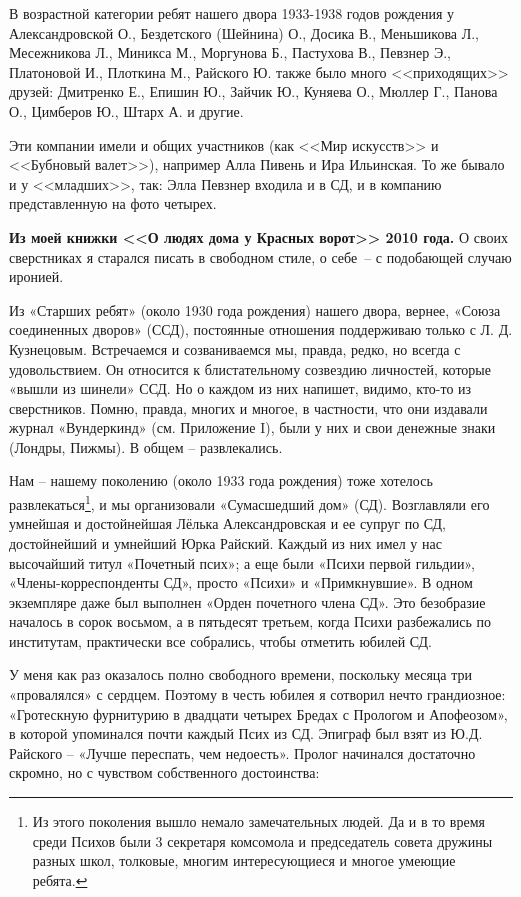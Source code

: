 \restoregeometry

\newpage

В возрастной категории ребят нашего двора 1933-1938 годов рождения у Александровской О., Бездетского (Шейнина) О., Досика В., Меньшикова Л., Месежникова Л., Миникса М., Моргунова Б., Пастухова В., Певзнер Э., Платоновой И., Плоткина М., Райского Ю. также было много <<приходящих>> друзей: Дмитренко Е., Епишин Ю., Зайчик Ю., Куняева О., Мюллер Г., Панова О., Цимберов Ю., Штарх А. и другие.

Эти компании имели и общих участников (как <<Мир искусств>> и <<Бубновый валет>>), например Алла Пивень и Ира Ильинская. То же бывало и у <<младших>>, так: Элла Певзнер входила и в СД, и в компанию представленную на фото четырех.


\indent

\textbf{Из моей книжки <<О людях дома у Красных ворот>> 2010 года.} О своих сверстниках я старался писать в свободном стиле, о себе~-- с подобающей случаю иронией.

﻿Из «Старших ребят» (около 1930 года рождения) нашего двора, вернее, «Союза соединенных дворов» (ССД), постоянные отношения поддерживаю только с Л. Д. Кузнецовым. Встречаемся и созваниваемся мы, правда, редко, но всегда с удовольствием. Он относится к блистательному созвездию личностей, которые «вышли из шинели» ССД. Но о каждом из них напишет, видимо, кто-то из сверстников. Помню, правда, многих и многое, в частности,  что они издавали журнал  «Вундеркинд» (см. Приложение I), были у них и свои денежные знаки (Лондры, Пижмы). В общем – развлекались.

Нам – нашему поколению (около 1933 года рождения) тоже хотелось развлекаться\footnote{Из этого поколения вышло немало замечательных людей. Да и в то время среди Психов были 3 секретаря комсомола и председатель совета дружины разных школ, толковые, многим интересующиеся и многое умеющие ребята.}, и мы организовали «Сумасшедший дом» (СД). Возглавляли его умнейшая и достойнейшая Лёлька Александровская и ее супруг по СД, достойнейший и умнейший Юрка Райский. Каждый из них имел у нас высочайший титул «Почетный псих»; а еще были «Психи первой гильдии», «Члены-корреспонденты СД», просто «Психи» и «Примкнувшие». В одном экземпляре даже был выполнен «Орден почетного члена СД». Это безобразие началось в сорок восьмом, а в пятьдесят     третьем,    когда     Психи     разбежались      по институтам, практически все собрались, чтобы отметить юбилей СД.

У меня как раз оказалось полно свободного времени, поскольку месяца три «провалялся» с сердцем. Поэтому в честь юбилея я сотворил нечто грандиозное: «Гротескную фурнитурию в двадцати четырех Бредах с Прологом и Апофеозом», в которой упоминался почти каждый Псих из СД. Эпиграф был взят из Ю.Д. Райского –   «Лучше переспать, чем недоесть». Пролог начинался достаточно скромно, но с чувством собственного достоинства: 

